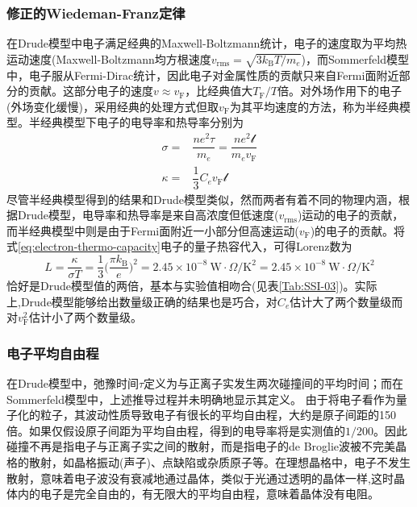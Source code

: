 \subsubsection{修正的Wiedeman-Franz定律} 
在Drude模型中电子满足经典的Maxwell-Boltzmann统计，电子的速度取为平均热运动速度(Maxwell-Boltzmann均方根速度$v_{\mathrm{rms}}=\sqrt{3k_{\mathrm{B}}T/m_e}$)，而Sommerfeld模型中，电子服从Fermi-Dirac统计，因此电子对金属性质的贡献只来自Fermi面附近部分的贡献。这部分电子的速度$v\approx v_{\mathrm{F}}$，比经典值大$T_{\mathrm{F}}/T$倍。对外场作用下的电子(外场变化缓慢)，采用经典的处理方式但取$v_{\mathrm{F}}$为其平均速度的方法，称为半经典模型。半经典模型下电子的电导率和热导率分别为
\begin{equation}
	\begin{aligned}
		\sigma=&\dfrac{ne^2\tau}{m_e}=\dfrac{ne^2\mathscr{l}}{m_ev_{\mathrm{F}}}\\
		\kappa=&\dfrac13C_ev_{\mathrm{F}}\mathscr{l}
	\end{aligned}
	\label{eq:electron-thermo_conduct}
\end{equation}
尽管半经典模型得到的结果和Drude模型类似，然而两者有着不同的物理内涵，根据Drude模型，电导率和热导率是来自高浓度但低速度($v_{\mathrm{rms}}$)运动的电子的贡献，而半经典模型中则是由于Fermi面附近一小部分但高速运动($v_{\mathrm{F}}$)的电子的贡献。将式\eqref{eq:electron-thermo-capacity}电子的量子热容代入，可得Lorenz数为
\begin{equation}
	L=\dfrac{\kappa}{\sigma T}=\dfrac13\bigg(\dfrac{\pi k_{\mathrm{B}}}e\bigg)^2=2.45\times10^{-8}~\mathrm{W}\cdot\Omega/\mathrm{K}^2=2.45\times10^{-8}~\mathrm{W}\cdot\Omega/\mathrm{K}^2
	\label{eq:Lorenz-num}
\end{equation}
恰好是Drude模型值的两倍，基本与实验值相吻合(见表\ref{Tab:SSI-03})。实际上,Drude模型能够给出数量级正确的结果也是巧合，对$C_e$估计大了两个数量级而对$v_{\mathrm{F}}^2$估计小了两个数量级。

\subsubsection{电子平均自由程}
在Drude模型中，弛豫时间$\tau$定义为与正离子实发生两次碰撞间的平均时间；而在Sommerfeld模型中，上述推导过程并未明确地显示其定义。%
由于将电子看作为量子化的粒子，其波动性质导致电子有很长的平均自由程，大约是原子间距的150倍。如果仅假设原子间距为平均自由程，得到的电导率将是实测值的$1/200$。因此碰撞不再是指电子与正离子实之间的散射，而是指电子的de Broglie波被不完美晶格的散射，如晶格振动(声子)、点缺陷或杂质原子等。在理想晶格中，电子不发生散射，意味着电子波没有衰减地通过晶体，类似于光通过透明的晶体一样,这时晶体内的电子是完全自由的，有无限大的平均自由程，意味着晶体没有电阻。

